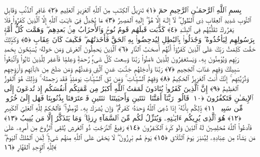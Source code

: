 
  
    
  
    
    

\nopagebreak
  بِسمِ ٱللَّهِ ٱلرَّحمَـٰنِ ٱلرَّحِيمِ
  حمٓ ﴿١﴾
 تَنزِيلُ ٱلكِتَـٰبِ مِنَ ٱللَّهِ ٱلعَزِيزِ ٱلعَلِيمِ ﴿٢﴾
 غَافِرِ ٱلذَّنۢبِ وَقَابِلِ ٱلتَّوبِ شَدِيدِ ٱلعِقَابِ ذِى ٱلطَّولِ ۖ لَآ إِلَـٰهَ إِلَّا هُوَ ۖ إِلَيهِ ٱلمَصِيرُ ﴿٣﴾
 مَا يُجَٰدِلُ فِىٓ ءَايَـٰتِ ٱللَّهِ إِلَّا ٱلَّذِينَ كَفَرُوا۟ فَلَا يَغرُركَ تَقَلُّبُهُم فِى ٱلبِلَـٰدِ ﴿٤﴾
 كَذَّبَت قَبلَهُم قَومُ نُوحٍۢ وَٱلأَحزَابُ مِنۢ بَعدِهِم ۖ وَهَمَّت كُلُّ أُمَّةٍۭ بِرَسُولِهِم لِيَأخُذُوهُ ۖ وَجَٰدَلُوا۟ بِٱلبَٰطِلِ لِيُدحِضُوا۟ بِهِ ٱلحَقَّ فَأَخَذتُهُم ۖ فَكَيفَ كَانَ عِقَابِ ﴿٥﴾
 وَكَذَٟلِكَ حَقَّت كَلِمَتُ رَبِّكَ عَلَى ٱلَّذِينَ كَفَرُوٓا۟ أَنَّهُم أَصحَـٰبُ ٱلنَّارِ ﴿٦﴾
 ٱلَّذِينَ يَحمِلُونَ ٱلعَرشَ وَمَن حَولَهُۥ يُسَبِّحُونَ بِحَمدِ رَبِّهِم وَيُؤمِنُونَ بِهِۦ وَيَستَغفِرُونَ لِلَّذِينَ ءَامَنُوا۟ رَبَّنَا وَسِعتَ كُلَّ شَىءٍۢ رَّحمَةًۭ وَعِلمًۭا فَٱغفِر لِلَّذِينَ تَابُوا۟ وَٱتَّبَعُوا۟ سَبِيلَكَ وَقِهِم عَذَابَ ٱلجَحِيمِ ﴿٧﴾
 رَبَّنَا وَأَدخِلهُم جَنَّـٰتِ عَدنٍ ٱلَّتِى وَعَدتَّهُم وَمَن صَلَحَ مِن ءَابَآئِهِم وَأَزوَٟجِهِم وَذُرِّيَّٰتِهِم ۚ إِنَّكَ أَنتَ ٱلعَزِيزُ ٱلحَكِيمُ ﴿٨﴾
 وَقِهِمُ ٱلسَّيِّـَٔاتِ ۚ وَمَن تَقِ ٱلسَّيِّـَٔاتِ يَومَئِذٍۢ فَقَد رَحِمتَهُۥ ۚ وَذَٟلِكَ هُوَ ٱلفَوزُ ٱلعَظِيمُ ﴿٩﴾
 إِنَّ ٱلَّذِينَ كَفَرُوا۟ يُنَادَونَ لَمَقتُ ٱللَّهِ أَكبَرُ مِن مَّقتِكُم أَنفُسَكُم إِذ تُدعَونَ إِلَى ٱلإِيمَـٰنِ فَتَكفُرُونَ ﴿١٠﴾
 قَالُوا۟ رَبَّنَآ أَمَتَّنَا ٱثنَتَينِ وَأَحيَيتَنَا ٱثنَتَينِ فَٱعتَرَفنَا بِذُنُوبِنَا فَهَل إِلَىٰ خُرُوجٍۢ مِّن سَبِيلٍۢ ﴿١١﴾
 ذَٟلِكُم بِأَنَّهُۥٓ إِذَا دُعِىَ ٱللَّهُ وَحدَهُۥ كَفَرتُم ۖ وَإِن يُشرَك بِهِۦ تُؤمِنُوا۟ ۚ فَٱلحُكمُ لِلَّهِ ٱلعَلِىِّ ٱلكَبِيرِ ﴿١٢﴾
 هُوَ ٱلَّذِى يُرِيكُم ءَايَـٰتِهِۦ وَيُنَزِّلُ لَكُم مِّنَ ٱلسَّمَآءِ رِزقًۭا ۚ وَمَا يَتَذَكَّرُ إِلَّا مَن يُنِيبُ ﴿١٣﴾
 فَٱدعُوا۟ ٱللَّهَ مُخلِصِينَ لَهُ ٱلدِّينَ وَلَو كَرِهَ ٱلكَـٰفِرُونَ ﴿١٤﴾
 رَفِيعُ ٱلدَّرَجَٰتِ ذُو ٱلعَرشِ يُلقِى ٱلرُّوحَ مِن أَمرِهِۦ عَلَىٰ مَن يَشَآءُ مِن عِبَادِهِۦ لِيُنذِرَ يَومَ ٱلتَّلَاقِ ﴿١٥﴾
 يَومَ هُم بَٰرِزُونَ ۖ لَا يَخفَىٰ عَلَى ٱللَّهِ مِنهُم شَىءٌۭ ۚ لِّمَنِ ٱلمُلكُ ٱليَومَ ۖ لِلَّهِ ٱلوَٟحِدِ ٱلقَهَّارِ ﴿١٦﴾

